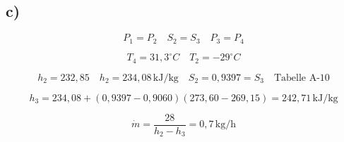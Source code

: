 

\subsection*{c)}

\[
P_{1} = P_{2} \quad S_{2} = S_{3} \quad P_{3} = P_{4}
\]

\[
T_{4} = 31,3^\circ C \quad T_{2} = -29^\circ C
\]

\[
h_{2} = 232,85 \quad h_{2} = 234,08 \, \text{kJ/kg} \quad S_{2} = 0,9397 = S_{3} \quad \text{Tabelle A-10}
\]

\[
h_{3} = 234,08 + (0,9397 - 0,9060) \left(273,60 - 269,15\right) = 242,71 \, \text{kJ/kg}
\]

\[
\dot{m} = \frac{28}{h_{2} - h_{3}} = 0,7 \, \text{kg/h}
\]